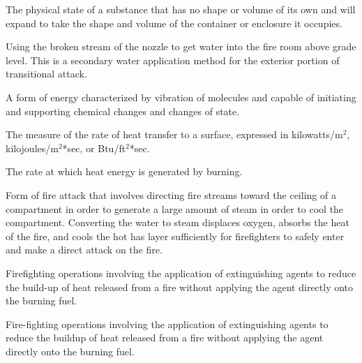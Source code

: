 \begin{description}
\item[Gas] \hfill
\begin{description}[leftmargin=!]
	\item The physical state of a substance that has no shape or volume of its own and will expand to take the shape and volume of the container or enclosure it occupies.
\end{description}

\item[Half Bale] \hfill
\begin{description}[leftmargin=!]
	\item Using the broken stream of the nozzle to get water into the fire room above grade level. This is a secondary water application method for the exterior portion of transitional attack.
\end{description}

\item[Heat] \hfill
\begin{description}[leftmargin=!]
	\item A form of energy characterized by vibration of molecules and capable of initiating and supporting chemical changes and changes of state.
\end{description}

\item[Heat Flux] \hfill
\begin{description}[leftmargin=!]
	\item The measure of the rate of heat transfer to a surface, expressed in kilowatts/m$^2$, kilojoules/m$^2$*sec, or Btu/ft$^2$*sec.
\end{description}

\hypertarget{HRR}{\item[Heat Release Rate (HRR)]} \hfill
\begin{description}[leftmargin=!]
	\item The rate at which heat energy is generated by burning.
\end{description}

\item[Indirect Attack] \hfill
\begin{description}[leftmargin=!]
	\item Form of fire attack that involves directing fire streams toward the ceiling of a compartment in order to generate a large amount of steam in order to cool the compartment.  Converting the water to steam displaces oxygen, absorbs the heat of the fire, and cools the hot has layer sufficiently for firefighters to safely enter and make a direct attack on the fire.  
	\item Firefighting operations involving the application of extinguishing agents to reduce the build-up of heat released from a fire without applying the agent directly onto the burning fuel.
	\item Fire-fighting operations involving the application of extinguishing agents to reduce the buildup of heat released from a fire without applying the agent directly onto the burning fuel.
\end{description}


\end{description}
